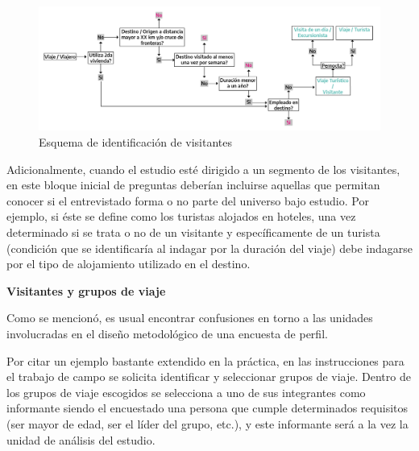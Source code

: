 \documentclass[
]{book}
\begin{document}
\begin{figure}

{\centering \includegraphics[width=1\linewidth]{imagenes/figura_1} 

}

\caption{Esquema de identificación de visitantes}\label{fig:identificacióndelosvisitantes}
\end{figure}

Adicionalmente, cuando el estudio esté dirigido a un segmento de los visitantes, en este bloque inicial de preguntas deberían incluirse aquellas que permitan conocer si el entrevistado forma o no parte del universo bajo estudio. Por ejemplo, si éste se define como los turistas alojados en hoteles, una vez determinado si se trata o no de un visitante y específicamente de un turista (condición que se identificaría al indagar por la duración del viaje) debe indagarse por el tipo de alojamiento utilizado en el destino.

\textbf{Visitantes y grupos de viaje}

Como se mencionó, es usual encontrar confusiones en torno a las unidades involucradas en el diseño metodológico de una encuesta de perfil.

Por citar un ejemplo bastante extendido en la práctica, en las instrucciones para el trabajo de campo se solicita identificar y seleccionar grupos de viaje. Dentro de los grupos de viaje escogidos se selecciona a uno de sus integrantes como informante siendo el encuestado una persona que cumple determinados requisitos (ser mayor de edad, ser el líder del grupo, etc.), y este informante será a la vez la unidad de análisis del estudio.
\end{document}
